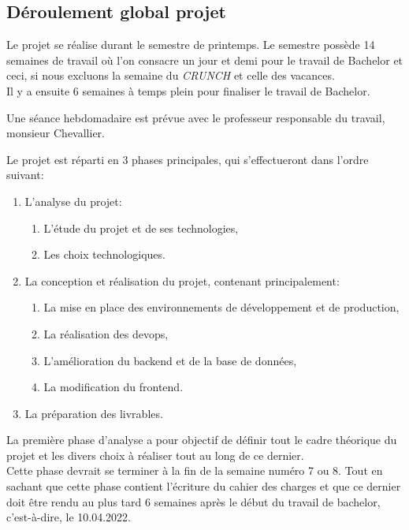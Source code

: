 \documentclass[
    iai, %
    il, %
]{heig-tb}
\begin{document}
\newpage
\subsection{Déroulement global projet}

Le projet se réalise durant le semestre de printemps. Le semestre possède 14 semaines de travail où l'on consacre un jour et demi pour le travail de Bachelor et ceci, si nous excluons la semaine du \emph{CRUNCH} et celle des vacances.\\
Il y a ensuite 6 semaines à temps plein pour finaliser le travail de Bachelor.

Une séance hebdomadaire est prévue avec le professeur responsable du travail, monsieur Chevallier.

Le projet est réparti en 3 phases principales, qui s'effectueront dans l'ordre suivant:
\begin{enumerate}
    \def\labelenumi{\arabic{enumi}.}
    \item L'analyse du projet:
          \begin{enumerate}
              \def\labelenumii{\alph{enumii}.}
              \item L'étude du projet et de ses technologies,
              \item Les choix technologiques.
          \end{enumerate}
    \item La conception et réalisation du projet, contenant principalement:
          \begin{enumerate}
              \def\labelenumii{\alph{enumii}.}
              \item La mise en place des environnements de développement et de production,
              \item La réalisation des \Gls{devops},
              \item L'amélioration du \Gls{backend} et de la base de données,
              \item La modification du \Gls{frontend}.
          \end{enumerate}
    \item La préparation des livrables.
\end{enumerate}

La première phase d'analyse a pour objectif de définir tout le cadre théorique du projet et les divers choix à réaliser tout au long de ce dernier.\\
Cette phase devrait se terminer à la fin de la semaine numéro 7 ou 8. Tout en sachant que cette phase contient l'écriture du cahier des charges et que ce dernier doit être rendu au plus tard 6 semaines après le début du travail de bachelor, c'est-à-dire, le 10.04.2022.
\end{document}
